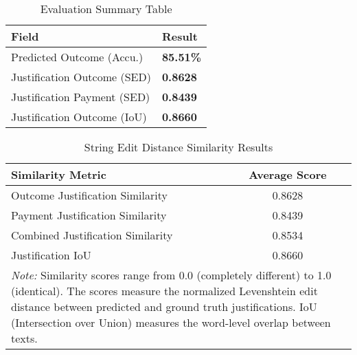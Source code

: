 
\begin{table}[H]
\centering
\caption{Evaluation Summary Table}
\label{tab:evaluation_summary}
\begin{tabular}{@{}lp{2cm}@{}}
\toprule
\textbf{Field} & \textbf{Result} \\
\midrule
Predicted Outcome (Accu.) & \textbf{85.51\%} \\
Justification Outcome (SED) &  \textbf{0.8628} \\
Justification Payment (SED) &  \textbf{0.8439} \\
Justification Outcome (IoU) &  \textbf{0.8660} \\
\bottomrule
\end{tabular}
\end{table}

\begin{table}[H]
\centering
\caption{String Edit Distance Similarity Results}
\label{tab:string_edit_distance_results}
\begin{tabular}{lc}
\toprule
\textbf{Similarity Metric} & \textbf{Average Score} \\
\midrule
Outcome Justification Similarity & 0.8628 \\
Payment Justification Similarity & 0.8439 \\
Combined Justification Similarity & 0.8534 \\
Justification IoU & 0.8660 \\
\midrule
\multicolumn{2}{p{13cm}}{\textit{Note:} Similarity scores range from 0.0 (completely different) to 1.0 (identical). 
The scores measure the normalized Levenshtein edit distance between predicted and ground truth justifications.
IoU (Intersection over Union) measures the word-level overlap between texts.} \\
\bottomrule
\end{tabular}
\end{table}

